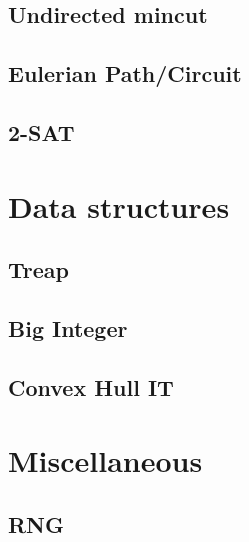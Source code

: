 \subsection{Undirected mincut}
\raggedbottom
\hrulefill
\subsection{Eulerian Path/Circuit}
\raggedbottom
\hrulefill
\subsection{2-SAT}
\raggedbottom
\hrulefill

\section{Data structures}
\subsection{Treap}
\raggedbottom
\hrulefill
\subsection{Big Integer}
\raggedbottom
\hrulefill
\subsection{Convex Hull IT}
\raggedbottom
\hrulefill

\section{Miscellaneous}
\subsection{RNG}
\raggedbottom
\hrulefill

